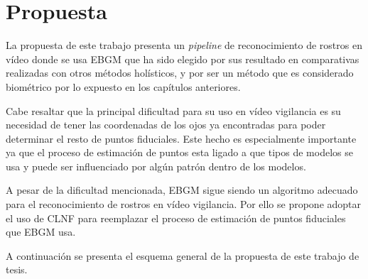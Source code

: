 \chapter{Propuesta} \label{chap:Propuesta}

La propuesta de este trabajo presenta un \textit{pipeline} de reconocimiento de rostros en vídeo donde se usa \ac{EBGM} que ha sido elegido por sus resultado en comparativas realizadas con otros métodos holísticos, y por ser un método que es considerado biométrico por lo expuesto en los capítulos anteriores.

Cabe resaltar que la principal dificultad para su uso en vídeo vigilancia es su necesidad de tener las coordenadas de los ojos ya encontradas para poder determinar el resto de puntos fiduciales. Este hecho es especialmente importante ya que el proceso de estimación de puntos esta ligado a que tipos de modelos se usa y puede ser influenciado por algún patrón dentro de los modelos.


A pesar de la dificultad mencionada, \ac{EBGM} sigue siendo un algoritmo adecuado para el reconocimiento de rostros en vídeo vigilancia. Por ello se propone adoptar el uso de \ac{CLNF} para reemplazar el proceso de estimación de puntos fiduciales que \ac{EBGM} usa.

A continuación se presenta el esquema general de la propuesta de este trabajo de tesis.

